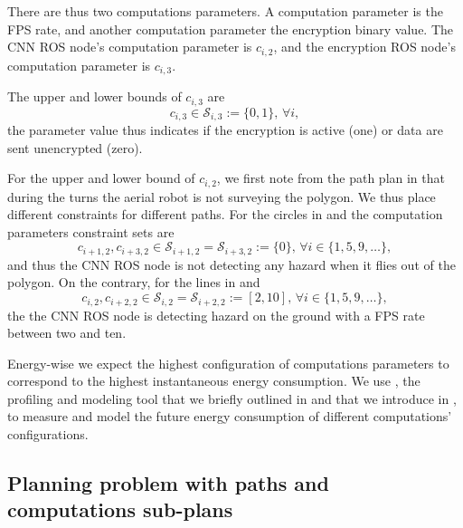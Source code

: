 There are thus two computations parameters. A computation parameter is the FPS rate, and another computation parameter the encryption binary value. The CNN ROS node's computation parameter is $c_{i,2}$, and the encryption ROS node's computation parameter is $c_{i,3}$.

The upper and lower bounds of $c_{i,3}$ are 
\begin{equation}
  c_{i,3}\in\mathcal{S}_{i,3}:=\{0,1\},\,\forall i,
\end{equation}
the parameter value thus indicates if the encryption is active (one) or data are sent unencrypted (zero).

For the upper and lower bound of $c_{i,2}$, we first note from the path plan in  that during the turns the aerial robot is not surveying the polygon. We thus place different constraints for different paths. For the circles in  and  the computation parameters constraint sets are 
\begin{equation}\label{eq:cnn-comp-const}
  c_{i+1,2},c_{i+3,2}\in\mathcal{S}_{i+1,2}=\mathcal{S}_{i+3,2}:=\{0\},\,\forall i\in\{1,5,9,\dots\},
\end{equation}
and thus the CNN ROS node is not detecting any hazard when it flies out of the polygon. On the contrary, for the lines in  and  
\begin{equation}\label{eq:encr-comp-const}
c_{i,2},c_{i+2,2}\in\mathcal{S}_{i,2}=\mathcal{S}_{i+2,2}:=[2,10],\,\forall i\in\{1,5,9,\dots\},
\end{equation} 
the the CNN ROS node is detecting hazard on the ground with a FPS rate between two and ten.

Energy-wise we expect the highest configuration of computations parameters to correspond to the highest instantaneous energy consumption. We use \powprof{}, the profiling and modeling tool that we briefly outlined in  and that we introduce in , to measure and model the future energy consumption of different computations' configurations.

\subsection{Planning problem with paths and computations sub-plans}

